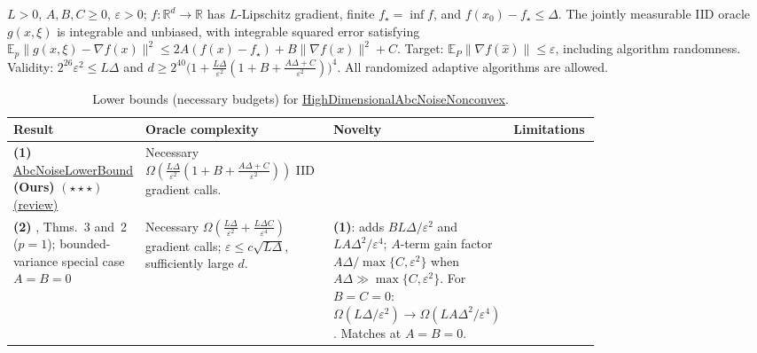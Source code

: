 \begin{table}[tp]
\centering
\caption{Lower bounds (necessary budgets) for \href{https://github.com/k3nfalt/longtails/blob/main/LongTails/Setups/HighDimensionalAbcNoiseNonconvex.lean}{HighDimensionalAbcNoiseNonconvex}.}\label{tab:HighDimensionalAbcNoiseNonconvex}
\parbox{\linewidth}{\footnotesize $L>0$, $A,B,C\ge0$, $\varepsilon>0$; $f:\mathbb R^d\to\mathbb R$ has $L$-Lipschitz gradient, finite $f_\star=\inf f$, and $f(x_0)-f_\star\le\Delta$. The jointly measurable IID oracle $g(x,\xi)$ is integrable and unbiased, with integrable squared error satisfying $\mathbb E_p\|g(x,\xi)-\nabla f(x)\|^2\le2A(f(x)-f_\star)+B\|\nabla f(x)\|^2+C$. Target: $\mathbb E_P\|\nabla f(\hat x)\|\le\varepsilon$, including algorithm randomness. Validity: $2^{26}\varepsilon^2\le L\Delta$ and $d\ge2^{40}\bigl(1+\frac{L\Delta}{\varepsilon^2}(1+B+\frac{A\Delta+C}{\varepsilon^2})\bigr)^4$. All randomized adaptive algorithms are allowed.}\par\smallskip
\begin{threeparttable}
\footnotesize
\setlength{\tabcolsep}{4pt}\renewcommand{\arraystretch}{1.25}
\begin{tabularx}{\linewidth}{@{}>{\raggedright\arraybackslash}p{0.20\linewidth}>{\raggedright\arraybackslash}p{0.32\linewidth}>{\raggedright\arraybackslash}p{0.25\linewidth}>{\raggedright\arraybackslash}X@{}}
\toprule
\textbf{Result} & \textbf{Oracle complexity} & \textbf{Novelty} & \textbf{Limitations} \\
\midrule
\textbf{(1)} \href{https://github.com/k3nfalt/longtails/blob/main/LongTails/Theorems/AbcNoiseLowerBound.lean}{Abc\allowbreak Noise\allowbreak Lower\allowbreak Bound} \textbf{(Ours)} $(\star\star\star)$ \href{https://github.com/k3nfalt/longtails/blob/main/scripts/reviews/AbcNoiseLowerBound.md}{(review)}
& Necessary $\displaystyle\Omega\!\left(\frac{L\Delta}{\varepsilon^2}\left(1+B+\frac{A\Delta+C}{\varepsilon^2}\right)\right)$ IID gradient calls. & & \\
\midrule[1.2pt]
\textbf{(2)} \citep{hdabcArjevaniV2,hdabcCarmonV3}, Thms.~3 and~2 ($p=1$); bounded-variance special case $A=B=0$
& Necessary $\displaystyle\Omega\!\left(\frac{L\Delta}{\varepsilon^2}+\frac{L\Delta C}{\varepsilon^4}\right)$ gradient calls; $\varepsilon\le c\sqrt{L\Delta}$, sufficiently large $d$.
& \textbf{(1)}: adds $BL\Delta/\varepsilon^2$ and $LA\Delta^2/\varepsilon^4$; $A$-term gain factor $A\Delta/\max\{C,\varepsilon^2\}$ when $A\Delta\gg\max\{C,\varepsilon^2\}$. For $B=C=0$: $\Omega(L\Delta/\varepsilon^2)\to\Omega(LA\Delta^2/\varepsilon^4)$. Matches at $A=B=0$.

\end{tabularx}
\end{threeparttable}
\end{table}

